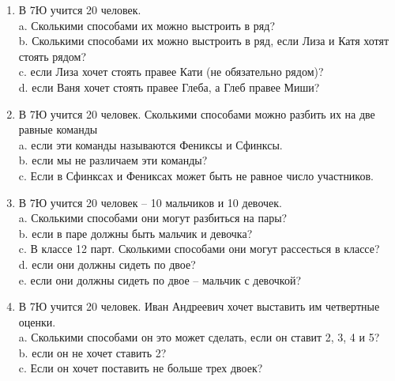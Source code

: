 \begin{enumerate}
	\item В 7Ю учится 20 человек. \\
	a.	Сколькими способами их можно выстроить в ряд? \\
	b.	Сколькими способами их можно выстроить в ряд, если Лиза и Катя хотят стоять рядом? \\
	c.	если Лиза хочет стоять правее Кати (не обязательно рядом)?\\
	d.	если Ваня хочет стоять правее Глеба, а Глеб правее Миши?
\item	В 7Ю учится 20 человек. Сколькими способами можно разбить их на две  равные команды\\
	a.	если эти команды называются Фениксы и Сфинксы.\\
	b.	если мы не различаем эти команды?\\
	c.	Если в Сфинксах и Фениксах может быть не равное число участников.
\item	В 7Ю учится 20 человек – 10 мальчиков и 10 девочек.\\
	a.	Сколькими способами они могут разбиться на пары?\\
	b.	если в паре должны быть мальчик и девочка?\\
	c.	В классе 12 парт. Сколькими способами они могут рассесться в классе?\\
	d.	если они должны сидеть по двое?\\
	e.	если они должны сидеть по двое – мальчик с девочкой?
\item	В 7Ю учится 20 человек. Иван Андреевич хочет выставить им четвертные оценки.\\
	a.	Сколькими способами он это может сделать, если он ставит 2, 3, 4 и 5?\\
	b.	если он не хочет ставить 2?\\
	c.	Если он хочет поставить не больше трех двоек?
\end{enumerate}
	 